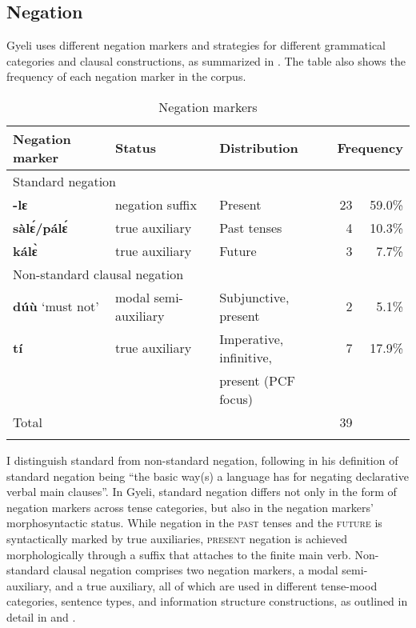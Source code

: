 \subsection*{Negation}

  

Gyeli uses different negation markers and strategies for different grammatical categories and clausal constructions, as summarized in . The table also shows the frequency of each negation marker in the corpus.

\begin{table}

\begin{tabularx}{\textwidth}{X @{}ll r@{~}r}
 \lsptoprule
Negation marker & Status & Distribution & \multicolumn{2}{l}{Frequency}\\
 \midrule
\multicolumn{5}{l}{Standard negation} \\
\midrule
{\bfseries -lɛ} &  negation suffix & Present & 23 & 59.0\% \\
{\bfseries sàlɛ́/pálɛ́} &  true auxiliary & Past tenses & 4 & 10.3\%  \\
{\bfseries kálɛ̀} &  true auxiliary & Future & 3 & 7.7\%  \\
 \midrule
\multicolumn{5}{l}{Non-standard clausal negation} \\
\midrule
{\bfseries dúù} `must not' & modal  semi-auxiliary & Subjunctive, present & 2 & 5.1\% \\
{\bfseries tí} &  true auxiliary & Imperative, infinitive,  & 7 & 17.9\% \\
 &  & present (PCF focus) & &  \\
 \midrule
Total & & & 39 &  \\
 \lspbottomrule
\end{tabularx}
\caption{Negation markers}
\label{Tab:NEG}
\end{table}

I distinguish standard from non-standard negation, following \citet[1]{miestamo2005} in his definition of standard negation being ``the basic way(s) a language has for negating declarative verbal main clauses''.  In Gyeli, standard negation differs not only in the form of negation markers across tense categories, but also in the negation markers' morphosyntactic status. While negation in the \textsc{past} tenses and the \textsc{future} is syntactically marked by true auxiliaries,  \textsc{present} negation is achieved morphologically through a suffix that attaches to the finite main verb. Non-standard clausal negation comprises two negation markers, a modal semi-auxiliary, and a true auxiliary, all of which are used in different tense-mood categories, sentence types, and information structure constructions, as outlined in detail in  and .











